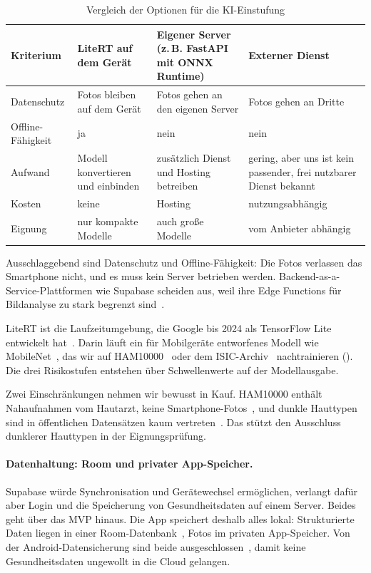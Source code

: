 \begin{table}[htbp]
\caption{Vergleich der Optionen für die KI-Einstufung}
\label{tab:ki-optionen}
\footnotesize
\renewcommand{\arraystretch}{1.15}
\begin{tabularx}{\textwidth}{@{}>{\RaggedRight\arraybackslash}p{2.3cm} >{\RaggedRight\arraybackslash}X >{\RaggedRight\arraybackslash}X >{\RaggedRight\arraybackslash}X@{}}
\toprule
\textbf{Kriterium} & \textbf{LiteRT auf dem Gerät} & \textbf{Eigener Server (z.\,B. FastAPI mit ONNX Runtime)} & \textbf{Externer Dienst} \\
\midrule
Datenschutz & Fotos bleiben auf dem Gerät & Fotos gehen an den eigenen Server & Fotos gehen an Dritte \\
Offline-Fähigkeit & ja & nein & nein \\
Aufwand & Modell konvertieren und einbinden & zusätzlich Dienst und Hosting betreiben & gering, aber uns ist kein passender, frei nutzbarer Dienst bekannt \\
Kosten & keine & Hosting & nutzungsabhängig \\
Eignung & nur kompakte Modelle & auch große Modelle & vom Anbieter abhängig \\
\bottomrule
\end{tabularx}
\end{table}

Ausschlaggebend sind Datenschutz und Offline-Fähigkeit: Die Fotos verlassen das Smartphone nicht, und es muss kein Server betrieben werden. Backend-as-a-Service-Plattformen wie Supabase scheiden aus, weil ihre Edge Functions für Bildanalyse zu stark begrenzt sind~\cite{supabase-limits}.

LiteRT ist die Laufzeitumgebung, die Google bis 2024 als TensorFlow Lite entwickelt hat~\cite{litert2024}. Darin läuft ein für Mobilgeräte entworfenes Modell wie MobileNet~\cite{howard2017mobilenets}, das wir auf HAM10000~\cite{tschandl2018ham10000} oder dem ISIC-Archiv~\cite{isic-archive} nachtrainieren (). Die drei Risikostufen entstehen über Schwellenwerte auf der Modellausgabe.

Zwei Einschränkungen nehmen wir bewusst in Kauf. HAM10000 enthält Nahaufnahmen vom Hautarzt, keine Smartphone-Fotos~\cite{tschandl2018ham10000}, und dunkle Hauttypen sind in öffentlichen Datensätzen kaum vertreten~\cite{wen2022datasets}. Das stützt den Ausschluss dunklerer Hauttypen in der Eignungsprüfung.

\paragraph{Datenhaltung: Room und privater App-Speicher.} Supabase würde Synchronisation und Gerätewechsel ermöglichen, verlangt dafür aber Login und die Speicherung von Gesundheitsdaten auf einem Server. Beides geht über das MVP hinaus. Die App speichert deshalb alles lokal: Strukturierte Daten liegen in einer Room-Datenbank~\cite{android-room}, Fotos im privaten App-Speicher. Von der Android-Datensicherung sind beide ausgeschlossen~\cite{android-autobackup}, damit keine Gesundheitsdaten ungewollt in die Cloud gelangen.


